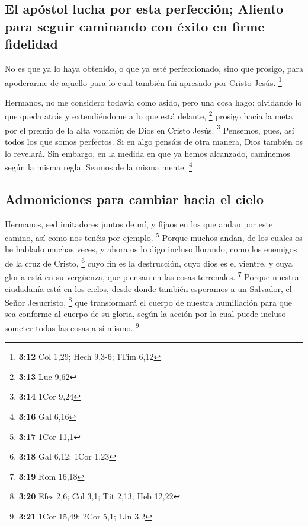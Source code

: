\begin{paracol}{2}
\hypertarget{el-apuxf3stol-lucha-por-esta-perfecciuxf3n-aliento-para-seguir-caminando-con-uxe9xito-en-firme-fidelidad}{%
\subsection{El apóstol lucha por esta perfección; Aliento para seguir
caminando con éxito en firme
fidelidad}\label{el-apuxf3stol-lucha-por-esta-perfecciuxf3n-aliento-para-seguir-caminando-con-uxe9xito-en-firme-fidelidad}}

 No es que ya lo haya obtenido, o que ya esté
perfeccionado, sino que prosigo, para apoderarme de aquello para lo cual
también fui apresado por Cristo Jesús. \footnote{\textbf{3:12} Col 1,29;
  Hech 9,3-6; 1Tim 6,12}

 Hermanos, no me considero todavía como asido, pero una
cosa hago: olvidando lo que queda atrás y extendiéndome a lo que está
delante, \footnote{\textbf{3:13} Luc 9,62}  prosigo hacia
la meta por el premio de la alta vocación de Dios en Cristo Jesús.
\footnote{\textbf{3:14} 1Cor 9,24}  Pensemos, pues, así
todos los que somos perfectos. Si en algo pensáis de otra manera, Dios
también os lo revelará.  Sin embargo, en la medida en que
ya hemos alcanzado, caminemos según la misma regla. Seamos de la misma
mente. \footnote{\textbf{3:16} Gal 6,16}

\hypertarget{admoniciones-para-cambiar-hacia-el-cielo}{%
\subsection{Admoniciones para cambiar hacia el
cielo}\label{admoniciones-para-cambiar-hacia-el-cielo}}

 Hermanos, sed imitadores juntos de mí, y fijaos en los
que andan por este camino, así como nos tenéis por ejemplo. \footnote{\textbf{3:17}
  1Cor 11,1}  Porque muchos andan, de los cuales os he
hablado muchas veces, y ahora os lo digo incluso llorando, como los
enemigos de la cruz de Cristo, \footnote{\textbf{3:18} Gal 6,12; 1Cor
  1,23}  cuyo fin es la destrucción, cuyo dios es el
vientre, y cuya gloria está en su vergüenza, que piensan en las cosas
terrenales. \footnote{\textbf{3:19} Rom 16,18}  Porque
nuestra ciudadanía está en los cielos, desde donde también esperamos a
un Salvador, el Señor Jesucristo, \footnote{\textbf{3:20} Efes 2,6; Col
  3,1; Tit 2,13; Heb 12,22}  que transformará el cuerpo
de nuestra humillación para que sea conforme al cuerpo de su gloria,
según la acción por la cual puede incluso someter todas las cosas a sí
mismo. \footnote{\textbf{3:21} 1Cor 15,49; 2Cor 5,1; 1Jn 3,2}


\end{paracol}
